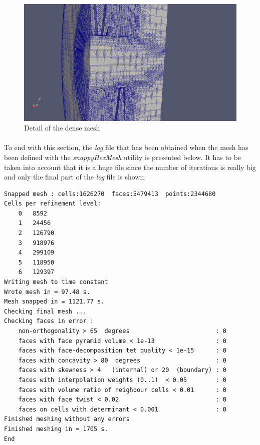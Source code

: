 \begin{figure}[h!]
\includegraphics[scale=0.24]{./mesh/screenshots/Xtreme5}
\centering
\caption{Detail of the dense mesh}
\label{dense3}
\end{figure}

\paragraph{}To end with this section, the \textit{log} file that has been obtained when the mesh has been defined with the \textit{snappyHexMesh} utility is presented below. It has to be taken into account that it is a huge file since the number of iterations is really big and only the final part of the \textit{log} file is shown.

\begin{footnotesize}
\begin{verbatim}
Snapped mesh : cells:1626270  faces:5479413  points:2344680
Cells per refinement level:
    0	8592
    1	24456
    2	126790
    3	918976
    4	299109
    5	118950
    6	129397
Writing mesh to time constant
Wrote mesh in = 97.48 s.
Mesh snapped in = 1121.77 s.
Checking final mesh ...
Checking faces in error :
    non-orthogonality > 65  degrees                        : 0
    faces with face pyramid volume < 1e-13                 : 0
    faces with face-decomposition tet quality < 1e-15      : 0
    faces with concavity > 80  degrees                     : 0
    faces with skewness > 4   (internal) or 20  (boundary) : 0
    faces with interpolation weights (0..1)  < 0.05        : 0
    faces with volume ratio of neighbour cells < 0.01      : 0
    faces with face twist < 0.02                           : 0
    faces on cells with determinant < 0.001                : 0
Finished meshing without any errors
Finished meshing in = 1705 s.
End
\end{verbatim}
\end{footnotesize}